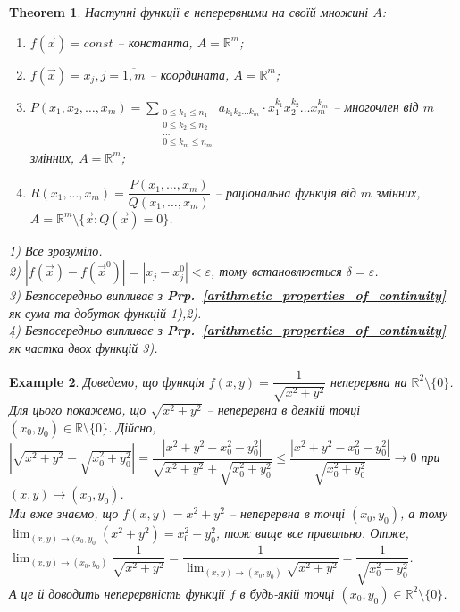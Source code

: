 \documentclass[a4paper, 10pt]{article}
\def\huge{\displaystyle}
\theoremstyle{theoremdd}
\newtheorem{theorem}{Theorem}[subsection]
\theoremstyle{theoremdd}
\theoremstyle{theoremdd}
\theoremstyle{theoremdd}
\theoremstyle{theoremdd}
\newtheorem{example}[theorem]{Example}
\theoremstyle{theoremdd}
\theoremstyle{theoremdd}
\theoremstyle{theoremdd}
\theoremstyle{theoremdd}
\newcommand\prpref[1]{\textbf{Prp.~\ref{#1}}}
\begin{document}
\begin{theorem}
Наступні функції є неперервними на своїй множині $A$:
\begin{enumerate}[nosep,wide=0pt,label={\arabic*)}]
\item $f(\vec{x}) = const$ -- константа, $A=\mathbb{R}^m$;
\item $f(\vec{x}) = x_j, j = \overline{1,m}$ -- координата, $A=\mathbb{R}^m$;
\item $P(x_1,x_2,\dots,x_m) = \huge\sum_{\substack{0 \leq k_1 \leq n_1 \\ 0 \leq k_2 \leq n_2 \\ \dots \\ 0 \leq k_m \leq n_m}} a_{k_1 k_2 \dots k_m} \cdot x_1^{k_1} x_2^{k_2} \dots x_m^{k_m}$ -- многочлен від $m$ змінних, $A=\mathbb{R}^m$;\\
\item $R(x_1,\dots,x_m) = \dfrac{P(x_1,\dots,x_m)}{Q(x_1,\dots,x_m)}$ -- раціональна функція від $m$ змінних, $A = \mathbb{R}^m \setminus \{\vec{x}: Q(\vec{x}) = 0 \}$.
\end{enumerate}
\end{theorem}

\textit{
1) Все зрозуміло.
\bigskip \\
2) $|f(\vec{x}) - f(\vec{x}^0)| = |x_j - x_j^0| < \varepsilon$, тому встановлюється $\delta = \varepsilon$.
\bigskip \\
3) Безпосередньо випливає з \prpref{arithmetic_properties_of_continuity} як сума та добуток функцій 1),2).
\bigskip \\
4) Безпосередньо випливає з \prpref{arithmetic_properties_of_continuity} як частка двох функцій 3).
}

\begin{example}
Доведемо, що функція $f(x,y) = \dfrac{1}{\sqrt{x^2+y^2}}$ неперервна на $\mathbb{R}^2 \setminus \{0\}$.\\
Для цього покажемо, що $\sqrt{x^2+y^2}$ -- неперервна в деякій точці $(x_0,y_0) \in \mathbb{R} \setminus \{0\}$. Дійсно,\\
$|\sqrt{x^2+y^2} - \sqrt{x_0^2+y_0^2}| = \dfrac{|x^2+y^2-x_0^2-y_0^2|}{\sqrt{x^2+y^2} + \sqrt{x_0^2+y_0^2}} \leq \dfrac{|x^2+y^2-x_0^2-y_0^2|}{\sqrt{x_0^2+y_0^2}} \to 0$ при $(x,y) \to (x_0,y_0)$.\\
Ми вже знаємо, що $f(x,y) = x^2+y^2$ -- неперервна в точці $(x_0,y_0)$, а тому $\displaystyle\lim_{(x,y) \to (x_0,y_0} (x^2+y^2) = x_0^2 + y_0^2$, тож вище все правильно. Отже, $\displaystyle\lim_{(x,y) \to (x_0,y_0)} \dfrac{1}{\sqrt{x^2+y^2}} = \dfrac{1}{\displaystyle\lim_{(x,y) \to (x_0,y_0)} \sqrt{x^2+y^2}} = \dfrac{1}{\sqrt{x_0^2+y_0^2}}$.\\
А це й доводить неперервність функції $f$ в будь-якій точці $(x_0,y_0) \in \mathbb{R}^2 \setminus \{0\}$. 
\end{example}
\end{document}
